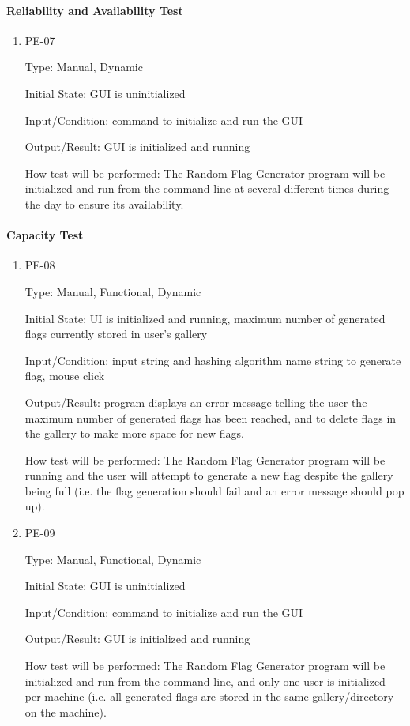 \documentclass[12pt, titlepage]{article}
\begin{document}
\paragraph{Reliability and Availability Test}

\begin{enumerate}

\item{PE-07\\}

Type: Manual, Dynamic

Initial State: GUI is uninitialized

Input/Condition: command to initialize and run the GUI

Output/Result: GUI is initialized and running

How test will be performed: The Random Flag Generator program will be
initialized and run from the command line at several different times during
the day to ensure its availability.

\end{enumerate}

\paragraph{Capacity Test}

\begin{enumerate}

\item{PE-08\\}

Type: Manual, Functional, Dynamic

Initial State: UI is initialized and running, maximum number of generated
flags currently stored in user's gallery

Input/Condition: input string and hashing algorithm name string to generate
flag, mouse click

Output/Result: program displays an error message telling the user the maximum
number of generated flags has been reached, and to delete flags in the gallery
to make more space for new flags.

How test will be performed: The Random Flag Generator program will be running
and the user will attempt to generate a new flag despite the gallery being
full (i.e. the flag generation should fail and an error message should pop
up).

\item{PE-09\\}

Type: Manual, Functional, Dynamic

Initial State: GUI is uninitialized

Input/Condition: command to initialize and run the GUI

Output/Result: GUI is initialized and running

How test will be performed: The Random Flag Generator program will be
initialized and run from the command line, and only one user is initialized
per machine (i.e. all generated flags are stored in the same gallery/directory
on the machine).

\end{enumerate}
\end{document}
